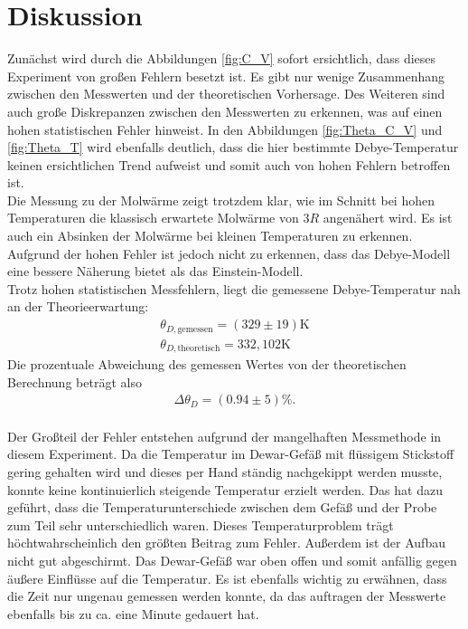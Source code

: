 \section{Diskussion}
\label{sec:Diskussion}
Zunächst wird durch die Abbildungen \ref{fig:C_V} sofort ersichtlich, dass dieses Experiment von großen Fehlern besetzt ist. 
Es gibt nur wenige Zusammenhang zwischen den Messwerten und der theoretischen Vorhersage. Des Weiteren sind 
auch große Diskrepanzen zwischen den Messwerten zu erkennen, was auf einen hohen statistischen Fehler hinweist. In den Abbildungen 
\ref{fig:Theta_C_V} und \ref{fig:Theta_T} wird ebenfalls deutlich, dass die hier bestimmte Debye-Temperatur keinen ersichtlichen Trend aufweist 
und somit auch von hohen Fehlern betroffen ist. \\
Die Messung zu der Molwärme zeigt trotzdem klar, wie im Schnitt bei hohen Temperaturen die klassisch erwartete Molwärme von $3 R$ angenähert wird. 
Es ist auch ein Absinken der Molwärme bei kleinen Temperaturen zu erkennen. Aufgrund der hohen Fehler ist jedoch nicht zu erkennen, dass das Debye-Modell eine bessere Näherung 
bietet als das Einstein-Modell.  \\

Trotz hohen statistischen Messfehlern, liegt die gemessene Debye-Temperatur nah an der Theorieerwartung:
\begin{align*}
    \theta_{D,\text{gemessen}} = (329 \pm 19) \si{\kelvin}\\
    \theta_{D,\text{theoretisch}} = 332,102 \si{\kelvin}
\end{align*}
Die prozentuale Abweichung des gemessen Wertes von der theoretischen Berechnung beträgt also
\begin{align*}
    \Delta \theta_D = (0.94\pm 5) \si{\%}.
\end{align*}
\\ 
Der Großteil der Fehler entstehen aufgrund der mangelhaften Messmethode in diesem Experiment. Da die Temperatur im Dewar-Gefäß mit flüssigem Stickstoff 
gering gehalten wird und dieses per Hand ständig nachgekippt werden musste, konnte keine kontinuierlich steigende Temperatur erzielt werden. 
Das hat dazu geführt, dass die Temperaturunterschiede zwischen dem Gefäß und der Probe zum Teil sehr unterschiedlich waren. 
Dieses Temperaturproblem trägt höchtwahrscheinlich den größten Beitrag zum Fehler. 
Außerdem ist der Aufbau nicht gut abgeschirmt. Das Dewar-Gefäß war oben offen und somit anfällig gegen äußere Einflüsse auf die Temperatur. 
Es ist ebenfalls wichtig zu erwähnen, dass die Zeit nur ungenau gemessen werden konnte, da das auftragen der Messwerte ebenfalls bis zu ca. eine Minute gedauert hat. 
